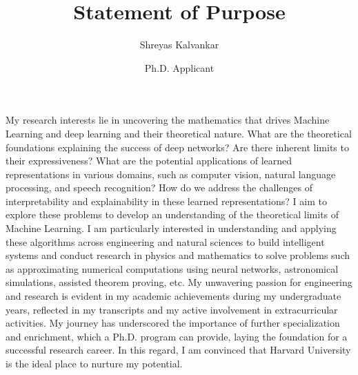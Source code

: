 \documentclass{article}
\title{Statement of Purpose}
\author{Shreyas Kalvankar}
\date{Ph.D. Applicant}
\begin{document}
  \maketitle%
  \thispagestyle{empty}

My research interests lie in uncovering the mathematics that drives Machine
Learning and deep learning and their theoretical nature. What are the
theoretical foundations explaining the success of deep networks? Are there
inherent limits to their expressiveness? What are the potential applications of
learned representations in various domains, such as computer vision, natural
language processing, and speech recognition? How do we address the challenges of
interpretability and explainability in these learned representations? I aim to
explore these problems to develop an understanding of the theoretical limits of
Machine Learning. I am particularly interested in understanding and applying
these algorithms across engineering and natural sciences to build intelligent
systems and conduct research in physics and mathematics to solve problems such
as approximating numerical computations using neural networks, astronomical
simulations, assisted theorem proving, etc. My unwavering passion for
engineering and research is evident in my academic achievements during my
undergraduate years, reflected in my transcripts and my active involvement in
extracurricular activities. My journey has underscored the importance of further
specialization and enrichment, which a Ph.D. program can provide, laying the
foundation for a successful research career. In this regard, I am convinced that
Harvard University is the ideal place to nurture my potential.
\end{document}
